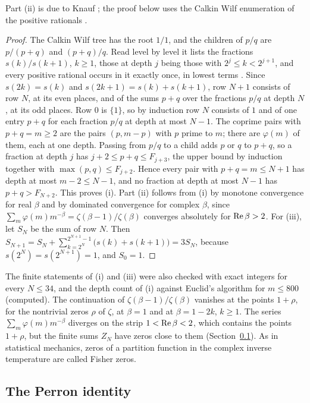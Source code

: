 Part (ii) is due to Knauf \cite{Knauf93}; the proof below uses the Calkin Wilf enumeration of the positive rationals \cite{CalkinWilf00}.

\begin{proof}
The Calkin Wilf tree has the root $1/1$, and the children of $p/q$ are $p/(p+q)$ and $(p+q)/q$. Read level by level it lists the fractions $s(k)/s(k+1)$, $k\ge1$, those at depth $j$ being those with $2^j\le k<2^{j+1}$, and every positive rational occurs in it exactly once, in lowest terms \cite{CalkinWilf00}. Since $s(2k)=s(k)$ and $s(2k+1)=s(k)+s(k+1)$, row $N+1$ consists of row $N$, at its even places, and of the sums $p+q$ over the fractions $p/q$ at depth $N$, at its odd places. Row $0$ is $\{1\}$, so by induction row $N$ consists of $1$ and of one entry $p+q$ for each fraction $p/q$ at depth at most $N-1$. The coprime pairs with $p+q=m\ge2$ are the pairs $(p,m-p)$ with $p$ prime to $m$; there are $\varphi(m)$ of them, each at one depth. Passing from $p/q$ to a child adds $p$ or $q$ to $p+q$, so a fraction at depth $j$ has $j+2\le p+q\le F_{j+3}$, the upper bound by induction together with $\max(p,q)\le F_{j+2}$. Hence every pair with $p+q=m\le N+1$ has depth at most $m-2\le N-1$, and no fraction at depth at most $N-1$ has $p+q>F_{N+2}$. This proves (i). Part (ii) follows from (i) by monotone convergence for real $\beta$ and by dominated convergence for complex $\beta$, since $\sum_m\varphi(m)m^{-\beta}=\zeta(\beta-1)/\zeta(\beta)$ converges absolutely for $\operatorname{Re}\beta>2$. For (iii), let $S_N$ be the sum of row $N$. Then $S_{N+1}=S_N+\sum_{k=2^N}^{2^{N+1}-1}\big(s(k)+s(k+1)\big)=3S_N$, because $s(2^N)=s(2^{N+1})=1$, and $S_0=1$.
\end{proof}

The finite statements of (i) and (iii) were also checked with exact integers for every $N\le34$, and the depth count of (i) against Euclid's algorithm for $m\le800$ (computed). The continuation of $\zeta(\beta-1)/\zeta(\beta)$ vanishes at the points $1+\rho$, for the nontrivial zeros $\rho$ of $\zeta$, at $\beta=1$ and at $\beta=1-2k$, $k\ge1$. The series $\sum_m\varphi(m)m^{-\beta}$ diverges on the strip $1<\operatorname{Re}\beta<2$, which contains the points $1+\rho$, but the finite sums $Z_N$ have zeros close to them (Section~\ref{fm:sec:perron}). As in statistical mechanics, zeros of a partition function in the complex inverse temperature are called Fisher zeros.

\subsection{The Perron identity}\label{fm:sec:perron}

